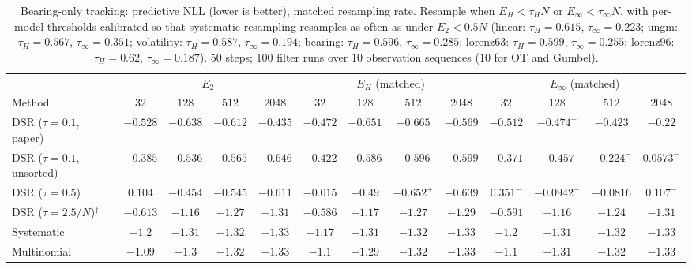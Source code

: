 \begin{table}[ht]
\centering
\small
\caption{Bearing-only tracking: predictive NLL (lower is better), matched resampling rate. Resample when $E_H<\tau_HN$ or $E_\infty<\tau_\infty N$, with per-model thresholds calibrated so that systematic resampling resamples as often as under $E_2<0.5N$ (linear: $\tau_H{=}0.615$, $\tau_\infty{=}0.223$; ungm: $\tau_H{=}0.567$, $\tau_\infty{=}0.351$; volatility: $\tau_H{=}0.587$, $\tau_\infty{=}0.194$; bearing: $\tau_H{=}0.596$, $\tau_\infty{=}0.285$; lorenz63: $\tau_H{=}0.599$, $\tau_\infty{=}0.255$; lorenz96: $\tau_H{=}0.62$, $\tau_\infty{=}0.187$). 50 steps; 100 filter runs over 10 observation sequences (10 for OT and Gumbel).}
\label{tab:trigger-matched-bearing-predictive_nll}
\begin{adjustbox}{max width=\linewidth}
\begin{tabular}{lcccc|cccc|cccc}
\toprule
 & \multicolumn{4}{c}{$E_2$} & \multicolumn{4}{c}{$E_H$ (matched)} & \multicolumn{4}{c}{$E_\infty$ (matched)} \\
\cmidrule(lr){2-5} \cmidrule(lr){6-9} \cmidrule(lr){10-13}
Method & $32$ & $128$ & $512$ & $2048$ & $32$ & $128$ & $512$ & $2048$ & $32$ & $128$ & $512$ & $2048$ \\
\midrule
DSR ($\tau{=}0.1$, paper) & $\mathbf{-0.528}$ & $-0.638$ & $-0.612$ & $-0.435$ & $-0.472$ & $\mathbf{-0.651}$ & $\mathbf{-0.665}$ & $\mathbf{-0.569}$ & $-0.512$ & $-0.474^{-}$ & $-0.423$ & $-0.22$ \\
DSR ($\tau{=}0.1$, unsorted) & $-0.385$ & $-0.536$ & $-0.565$ & $\mathbf{-0.646}$ & $\mathbf{-0.422}$ & $\mathbf{-0.586}$ & $\mathbf{-0.596}$ & $-0.599$ & $-0.371$ & $-0.457$ & $-0.224^{-}$ & $0.0573^{-}$ \\
DSR ($\tau{=}0.5$) & $0.104$ & $-0.454$ & $-0.545$ & $-0.611$ & $\mathbf{-0.015}$ & $\mathbf{-0.49}$ & $\mathbf{-0.652}^{+}$ & $\mathbf{-0.639}$ & $0.351^{-}$ & $-0.0942^{-}$ & $-0.0816$ & $0.107^{-}$ \\
DSR ($\tau{=}2.5/N$)$^\dagger$ & $\mathbf{-0.613}$ & $-1.16$ & $-1.27$ & $-1.31$ & $-0.586$ & $\mathbf{-1.17}$ & $\mathbf{-1.27}$ & $-1.29$ & $-0.591$ & $-1.16$ & $-1.24$ & $\mathbf{-1.31}$ \\
\midrule
Systematic & $\mathbf{-1.2}$ & $-1.31$ & $-1.32$ & $\mathbf{-1.33}$ & $-1.17$ & $-1.31$ & $-1.32$ & $-1.33$ & $-1.2$ & $\mathbf{-1.31}$ & $\mathbf{-1.32}$ & $-1.33$ \\
Multinomial & $-1.09$ & $-1.3$ & $\mathbf{-1.32}$ & $\mathbf{-1.33}$ & $\mathbf{-1.1}$ & $-1.29$ & $-1.32$ & $-1.33$ & $-1.1$ & $\mathbf{-1.31}$ & $-1.32$ & $-1.33$ \\

\end{tabular}
\end{adjustbox}
\end{table}
